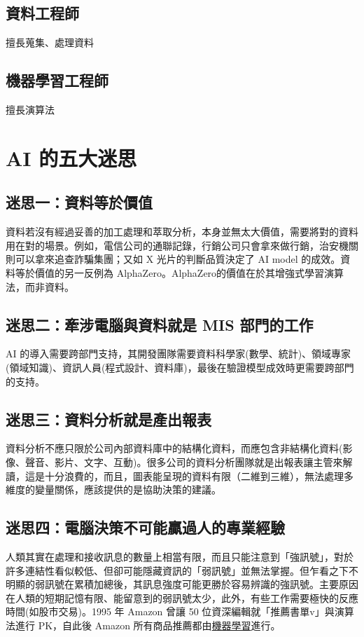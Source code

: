 \documentclass[a4paper,12pt]{article}
\begin{document}
\subsection{資料工程師}
\label{sec:org24afd51}
擅長蒐集、處理資料\\
\subsection{機器學習工程師}
\label{sec:org702d7e3}
擅長演算法\\

\section{AI 的五大迷思}
\label{sec:orgb72ffa5}
\subsection{迷思一：資料等於價值}
\label{sec:org3a0b89d}
資料若沒有經過妥善的加工處理和萃取分析，本身並無太大價值，需要將對的資料用在對的場景。例如，電信公司的通聯記錄，行銷公司只會拿來做行銷，治安機關則可以拿來追查詐騙集團；又如 X 光片的判斷品質決定了 AI model 的成效。資料等於價值的另一反例為 AlphaZero。AlphaZero的價值在於其增強式學習演算法，而非資料。\\
\subsection{迷思二：牽涉電腦與資料就是 MIS 部門的工作}
\label{sec:org86d24ab}
AI 的導入需要跨部門支持，其開發團隊需要資料科學家(數學、統計)、領域專家(領域知識)、資訊人員(程式設計、資料庫)，最後在驗證模型成效時更需要跨部門的支持。\\
\subsection{迷思三：資料分析就是產出報表}
\label{sec:orgd6cbae7}
資料分析不應只限於公司內部資料庫中的結構化資料，而應包含非結構化資料(影像、聲音、影片、文字、互動)。很多公司的資料分析團隊就是出報表讓主管來解讀，這是十分浪費的，而且，圖表能呈現的資料有限（二維到三維），無法處理多維度的變量關係，應該提供的是協助決策的建議。\\
\subsection{迷思四：電腦決策不可能贏過人的專業經驗}
\label{sec:org0211663}
人類其實在處理和接收訊息的數量上相當有限，而且只能注意到「強訊號」，對於許多連結性看似較低、但卻可能隱藏資訊的「弱訊號」並無法掌握。但乍看之下不明顯的弱訊號在累積加總後，其訊息強度可能更勝於容易辨識的強訊號。主要原因在人類的短期記憶有限、能留意到的弱訊號太少，此外，有些工作需要極快的反應時間(如股市交易)。1995 年 Amazon 曾讓 50 位資深編輯就「推薦書單v」與演算法進行 PK，自此後 Amazon 所有商品推薦都由\href{MachineLearning.org}{機器學習}進行。\\
\end{document}
